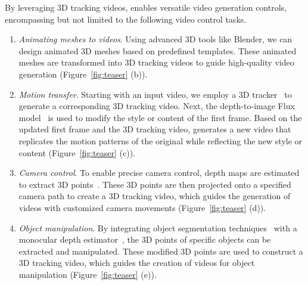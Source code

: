 By leveraging 3D tracking videos, \methodname enables versatile video generation controls, encompassing but not limited to the following video control tasks.
\begin{enumerate}[itemsep=0pt,leftmargin=0.5cm]
    \vspace{-12pt}
    \item \textit{Animating meshes to videos}. Using advanced 3D tools like Blender, we can design animated 3D meshes based on predefined templates. These animated meshes are transformed into 3D tracking videos to guide high-quality video generation (Figure~\ref{fig:teaser} (b)).
    \item \textit{Motion transfer}. Starting with an input video, we employ a 3D tracker~\cite{xiao2024spatialtracker} to generate a corresponding 3D tracking video. Next, the depth-to-image Flux model~\cite{flux} is used to modify the style or content of the first frame. Based on the updated first frame and the 3D tracking video, \methodname generates a new video that replicates the motion patterns of the original while reflecting the new style or content (Figure~\ref{fig:teaser} (c)).
    \item \textit{Camera control}. To enable precise camera control, depth maps are estimated to extract 3D points~\cite{bochkovskii2024depth}. These 3D points are then projected onto a specified camera path to create a 3D tracking video, which guides the generation of videos with customized camera movements (Figure~\ref{fig:teaser} (d)).
    \item \textit{Object manipulation}. By integrating object segmentation techniques~\cite{kirillov2023segment} with a monocular depth estimator~\cite{bochkovskii2024depth}, the 3D points of specific objects can be extracted and manipulated. These modified 3D points are used to construct a 3D tracking video, which guides the creation of videos for object manipulation (Figure~\ref{fig:teaser} (e)).
\end{enumerate}



